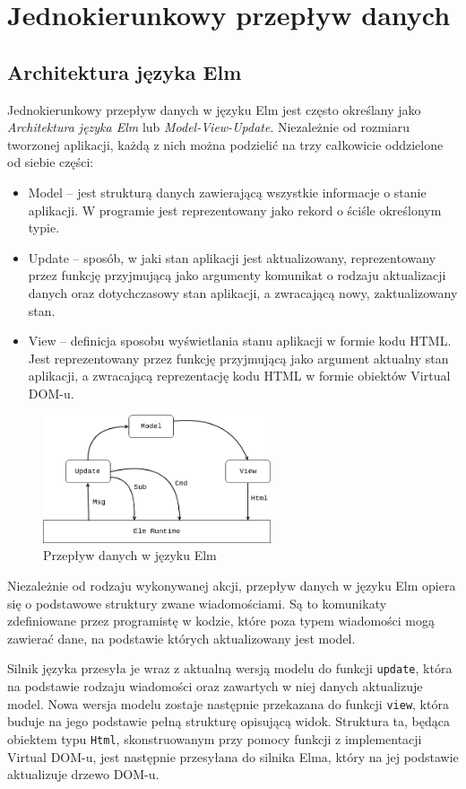\section{Jednokierunkowy przepływ danych}
\subsection{Architektura języka Elm}
Jednokierunkowy przepływ danych w języku Elm jest często określany jako \textit{Architektura języka Elm} lub \textit{Model-View-Update}. Niezależnie od rozmiaru tworzonej aplikacji, każdą z nich można podzielić na trzy całkowicie oddzielone od siebie części:
\begin{itemize}
	\item Model -- jest strukturą danych zawierającą wszystkie informacje o stanie aplikacji. W programie jest reprezentowany jako rekord o ściśle określonym typie.
	\item Update -- sposób, w jaki stan aplikacji jest aktualizowany, reprezentowany przez funkcję przyjmującą jako argumenty komunikat o rodzaju aktualizacji danych oraz dotychczasowy stan aplikacji, a zwracającą nowy, zaktualizowany stan.
	\item View -- definicja sposobu wyświetlania stanu aplikacji w formie kodu HTML. Jest reprezentowany przez funkcję przyjmującą jako argument aktualny stan aplikacji, a zwracającą reprezentację kodu HTML w formie obiektów Virtual DOM-u.
\end{itemize}
\begin{figure}[h]
	\centering
	\includegraphics[width=0.6\textwidth]{images/elm_data_flow}
	\caption{Przepływ danych w języku Elm}
	\label{fig:elmFlow}
\end{figure}
\FloatBarrier
Niezależnie od rodzaju wykonywanej akcji, przepływ danych w języku Elm opiera się o podstawowe struktury zwane wiadomościami. Są to komunikaty zdefiniowane przez programistę w kodzie, które poza typem wiadomości mogą zawierać dane, na podstawie których aktualizowany jest model. 

Silnik języka przesyła je wraz z aktualną wersją modelu do funkcji \lstinline{update}, która na podstawie rodzaju wiadomości oraz zawartych w niej danych aktualizuje model. Nowa wersja modelu zostaje następnie przekazana do funkcji \lstinline{view}, która buduje na jego podstawie pełną strukturę opisującą widok. Struktura ta, będąca obiektem typu \lstinline[style=elm-style]{Html}, skonstruowanym przy pomocy funkcji z implementacji Virtual DOM-u, jest następnie przesyłana do silnika Elma, który na jej podstawie aktualizuje drzewo DOM-u.

